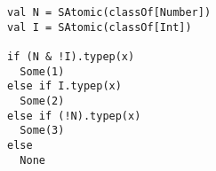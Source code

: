 \begin{lstlisting}[style=reclojureScala]
val N = SAtomic(classOf[Number])
val I = SAtomic(classOf[Int])

if (N & !I).typep(x)
  Some(1)
else if I.typep(x)
  Some(2)
else if (!N).typep(x)
  Some(3)
else
  None
\end{lstlisting}
